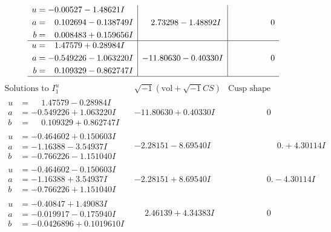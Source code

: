 \documentclass[1p]{elsarticle_modified}
\theoremstyle{definition}
\newcommand{\I}{\sqrt{-1}}
\begin{document}
$$\begin{array}{c|c|c}
\begin{aligned}
u &= -0.00527 - 1.48621 I \\
a &= \phantom{-}0.102694 - 0.138749 I \\
b &= \phantom{-}0.008483 + 0.159656 I\end{aligned}
 & \phantom{-}2.73298 - 1.48892 I & \phantom{-0.000000 } 0 \\ \hline\begin{aligned}
u &= \phantom{-}1.47579 + 0.28984 I \\
a &= -0.549226 - 1.063220 I \\
b &= \phantom{-}0.109329 - 0.862747 I\end{aligned}
 & -11.80630 - 0.40330 I & \phantom{-0.000000 } 0\\
 \hline 
 \end{array}$$\newpage$$\begin{array}{c|c|c}  
\text{Solutions to }I^u_{1}& \I (\text{vol} + \sqrt{-1}CS) & \text{Cusp shape}\\
 \hline 
\begin{aligned}
u &= \phantom{-}1.47579 - 0.28984 I \\
a &= -0.549226 + 1.063220 I \\
b &= \phantom{-}0.109329 + 0.862747 I\end{aligned}
 & -11.80630 + 0.40330 I & \phantom{-0.000000 } 0 \\ \hline\begin{aligned}
u &= -0.464602 + 0.150603 I \\
a &= -1.16388 - 3.54937 I \\
b &= -0.766226 - 1.151040 I\end{aligned}
 & -2.28151 - 8.69540 I & \phantom{-0.000000 -}0. + 4.30114 I \\ \hline\begin{aligned}
u &= -0.464602 - 0.150603 I \\
a &= -1.16388 + 3.54937 I \\
b &= -0.766226 + 1.151040 I\end{aligned}
 & -2.28151 + 8.69540 I & \phantom{-0.000000 } 0. - 4.30114 I \\ \hline\begin{aligned}
u &= -0.40847 + 1.49083 I \\
a &= -0.019917 - 0.175940 I \\
b &= -0.0426896 + 0.1019610 I\end{aligned}
 & \phantom{-}2.46139 + 4.34383 I & \phantom{-0.000000 } 0 \\ \hline\begin{aligned}

\end{aligned}
\end{array}$$
\end{document}
